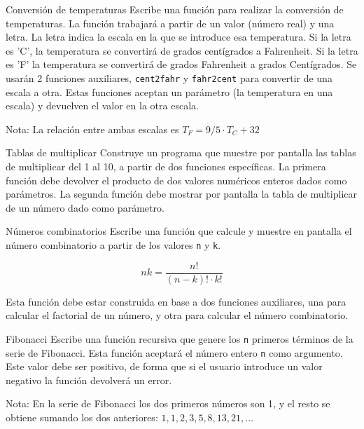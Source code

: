 \documentclass[xcolor={usenames,svgnames,dvipsnames}]{beamer}
\begin{document}
\begin{frame}[label={sec:org882d42e},fragile]{Conversión de temperaturas}
   Escribe una función para realizar la conversión de temperaturas. La función trabajará a partir de un valor (número real) y una letra. La letra indica la escala en la que se introduce esa temperatura. Si la letra es 'C', la temperatura se convertirá de grados centígrados a Fahrenheit. Si la letra es 'F' la temperatura se convertirá de grados Fahrenheit a grados Centígrados. 
Se usarán 2 funciones auxiliares, \texttt{cent2fahr} y \texttt{fahr2cent} para convertir de una escala a otra. Estas funciones aceptan un parámetro (la temperatura en una escala) y devuelven el valor en la otra escala. 

Nota: La relación entre ambas escalas es \(T_F = 9/5 \cdot T_C + 32\)
\end{frame}

\begin{frame}[label={sec:orgf5cc504}]{Tablas de multiplicar}
Construye un programa que muestre por pantalla las tablas de multiplicar del 1 al 10, a partir de dos funciones específicas. La primera función debe devolver el producto de dos valores numéricos enteros dados como parámetros. La segunda función debe mostrar por pantalla la tabla de multiplicar de un número dado como parámetro.
\end{frame}

\begin{frame}[label={sec:orga4915e2},fragile]{Números combinatorios}
 Escribe una función que calcule y muestre en pantalla el número combinatorio a partir de los valores \texttt{n} y \texttt{k}.

\[
 nk = \frac{n!}{(n - k)! \cdot k!}
 \]

Esta función debe estar construida en base a dos funciones auxiliares, una para calcular el factorial de un número, y otra para calcular el número combinatorio.
\end{frame}

\begin{frame}[label={sec:orgb0edaa6},fragile]{Fibonacci}
 Escribe una \alert{función recursiva} que genere los \texttt{n} primeros términos de la serie de Fibonacci. Esta función aceptará el número entero \texttt{n} como argumento. Este valor debe ser positivo, de forma que si el usuario introduce un valor negativo la función devolverá un error.

Nota: En la serie de Fibonacci los dos primeros números son 1, y el resto se obtiene sumando los dos anteriores: \(1, 1, 2, 3, 5, 8, 13, 21, \ldots\)
\end{frame}
\end{document}
